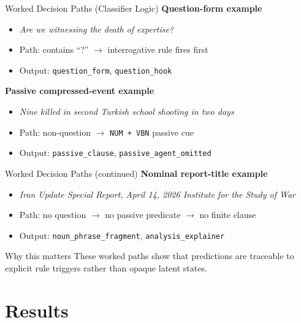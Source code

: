 \documentclass[aspectratio=169, 11pt]{beamer}
\begin{document}
\begin{frame}{Worked Decision Paths (Classifier Logic)}
  \textbf{Question-form example}
  \begin{itemize}
    \item \textit{Are we witnessing the death of expertise?}
    \item Path: contains ``?'' $\rightarrow$ interrogative rule fires first
    \item Output: \texttt{question\_form}, \texttt{question\_hook}
  \end{itemize}

  \vspace{0.6em}
  \textbf{Passive compressed-event example}
  \begin{itemize}
    \item \textit{Nine killed in second Turkish school shooting in two days}
    \item Path: non-question $\rightarrow$ \texttt{NUM + VBN} passive cue
    \item Output: \texttt{passive\_clause}, \texttt{passive\_agent\_omitted}
  \end{itemize}
\end{frame}

\begin{frame}{Worked Decision Paths (continued)}
  \textbf{Nominal report-title example}
  \begin{itemize}
    \item \textit{Iran Update Special Report, April 14, 2026 Institute for the Study of War}
    \item Path: no question $\rightarrow$ no passive predicate $\rightarrow$ no finite clause
    \item Output: \texttt{noun\_phrase\_fragment}, \texttt{analysis\_explainer}
  \end{itemize}

  \vspace{0.8em}
  \begin{block}{Why this matters}
    These worked paths show that predictions are traceable to explicit rule triggers rather than opaque latent states.
  \end{block}
\end{frame}

\section{Results}
\end{document}
